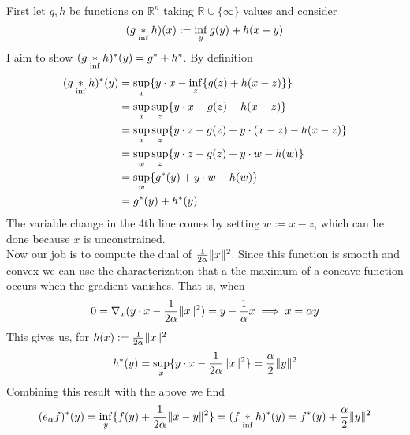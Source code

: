 \documentclass{article}
\newenvironment{ex}[1]
  {\renewcommand\theexercise{#1}\exercise}
  {\endexercise}
\newcommand{\R}[1]{\mathbb{R}^{#1}}
\begin{document}
\begin{ex}{11.12} %
  \newcommand{\icon}[2]{\parens{#1 \underset{\tiny \inf}{\ast} #2}}
  First let $g, h$ be functions on $\R{n}$ taking $\R{} \cup \{\infty\}$ values and consider
  $$
  \icon{g}{h}(x) := \inf_y g(y) + h(x-y)
  $$
  I aim to show $\icon{g}{h}^*(y) = g^* + h^*$. By definition
  \begin{align*}
    \icon{g}{h}^*(y) &= \sup_x \braces{ y \cdot x - \inf_z \braces{ g(z) + h(x - z) } } \\
    &= \sup_x \sup_z \braces{ y \cdot x - g(z) - h(x - z) } \\
    &= \sup_x \sup_z \braces{ y \cdot z - g(z) + y\cdot (x - z) - h(x - z) } \\
    &= \sup_w \sup_z \braces{ y \cdot z - g(z) + y \cdot w - h(w) } \\
    &= \sup_w \braces{ g^*(y) + y \cdot w - h(w) } \\
    &= g^*(y) + h^*(y)
  \end{align*}
  The variable change in the 4th line comes by setting $w := x - z$, which can be done because $x$ is unconstrained. \, \\

  Now our job is to compute the dual of $\frac{1}{2\alpha} \lVert x\rVert^2$. Since this function is smooth and convex we can use the characterization that a the maximum of a concave function occurs when the gradient vanishes. That is, when
  $$
    0 = \nabla_x ( y\cdot x - \frac{1}{2\alpha} \lVert x\rVert^2 ) = y - \frac{1}{\alpha} x \implies x = \alpha y
  $$
  This gives us, for $h(x) := \frac{1}{2\alpha} \lVert x\rVert^2$
  $$
  h^*(y) = \sup_x \{ y\cdot x - \frac{1}{2\alpha} \lVert x\rVert^2 \} = \frac{\alpha}{2} \lVert y\rVert^2
  $$
  Combining this result with the above we find
  $$
  \parens{e_\alpha f}^*(y) = \inf_y \braces{ f(y) + \frac{1}{2\alpha} \norm{x - y}^2 } = \icon{f}{h}^*(y) = f^*(y) + \frac{\alpha}{2} \norm{y}^2
  $$
\end{ex} %
\end{document}
